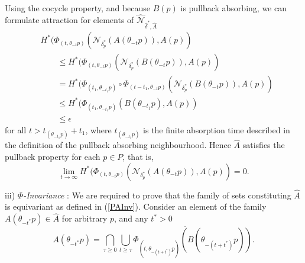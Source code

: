 \begin{prf}
  Using the cocycle property, and because $B(p)$ is pullback absorbing, we
  can formulate attraction for elements of
  $\hat{\mathcal{N}}_{\hat{\delta}^*,\hat{A}}$
  \begin{equation*}
  \begin{split}
  &H^*(\Phi_{(t,
  \theta_{-t}p)}(\mathcal{N}_{\delta^*_p}(A(\theta_{-t}p)),A(p)) \\
  & \qquad \leq H^*(\Phi_{(t,
  \theta_{-t}p)}(\mathcal{N}_{\delta^*_p}(B(\theta_{-t}p)),A(p)) \\
  &\qquad = H^*(\Phi_{(t_1, \theta_{-t_1}p)}
          \circ \Phi_{(t-t_1,
          \theta_{-t}p)}
          (\mathcal{N}_{\delta^*_p}(B(\theta_{-t}p)),A(p)) \\
  &\qquad \leq H^*(\Phi_{(t_1, \theta_{-t_1}p)}
          (B(\theta_{-t_1}p),A(p)) \\
  &\qquad \leq \epsilon
  \end{split}
  \end{equation*}
  for all $t > t_{(\theta_{-t_1}p)} +t_1$, where
  $t_{(\theta_{-t_1}p)}$ is the finite absorption time described in the definition of  
  the pullback absorbing neighbourhood.
  Hence $\hat{A}$ satisfies the pullback property for each $p \in P$, that is,
  \[ \lim_{t \to \infty} H^* (\Phi_{(t, \theta_{-t}p)}
            (\mathcal{N}_{\delta^*_p}(A(\theta_{-t}p)),A(p)) = 0. \]

  \hspace*{3mm} iii) {\em $\Phi$-Invariance} : We are required to prove
  that the family of sets constituting $\hat{A}$ is equivariant as defined
  in (\ref{PAInv}). Consider an element of the family $A(\theta_{-t^*}p)
  \in \hat{A}$ for arbitrary $p$, and any $t^*>0$
  \begin{equation}\label{shiftedatt}
     A(\theta_{-t^*}p) = \bigcap_{\tau \geq 0} \overline{ \bigcup_{t \geq
             \tau} \Phi_{(t, \theta_{-(t + t^*)}p)} (B(\theta_{-(t +
             t^*)}p))}.
  \end{equation}


\end{prf}
